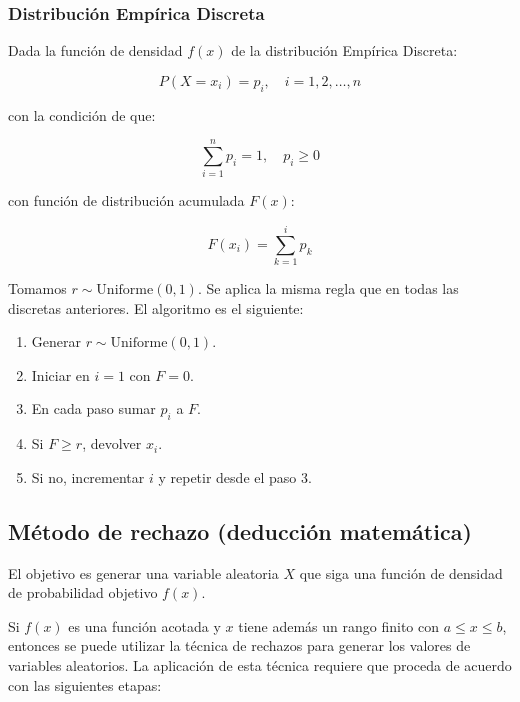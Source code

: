 \documentclass{article}
\begin{document}
\subsubsection{Distribución Empírica Discreta}

Dada la función de densidad $f(x)$ de la distribución Empírica Discreta:

\begin{equation}
    P(X = x_i) = p_i, \quad i = 1, 2, \ldots, n
\end{equation}

con la condición de que:

\begin{equation}
    \sum_{i=1}^{n} p_i = 1, \quad p_i \geq 0
\end{equation}

con función de distribución acumulada $F(x)$:

\begin{equation}
    F(x_i) = \sum_{k=1}^{i} p_k
\end{equation}

Tomamos $r \sim \mathrm{Uniforme}(0,1)$. Se aplica la misma regla que en todas las
discretas anteriores. El algoritmo es el siguiente:

\begin{enumerate}
    \item Generar $r \sim \mathrm{Uniforme}(0,1)$.
    \item Iniciar en $i = 1$ con $F = 0$.
    \item En cada paso sumar $p_i$ a $F$.
    \item Si $F \geq r$, devolver $x_i$.
    \item Si no, incrementar $i$ y repetir desde el paso 3.
\end{enumerate}


\subsection{Método de rechazo (deducción matemática)}

El objetivo es generar una variable aleatoria $X$ que siga una función de densidad de
probabilidad objetivo $f(x)$.

Si $f(x)$ es una función acotada y $x$ tiene además un rango finito con $a \leq x \leq b$,
entonces se puede utilizar la técnica de rechazos para generar los valores de variables
aleatorios. La aplicación de esta técnica requiere que proceda de acuerdo con las
siguientes etapas:
\end{document}
